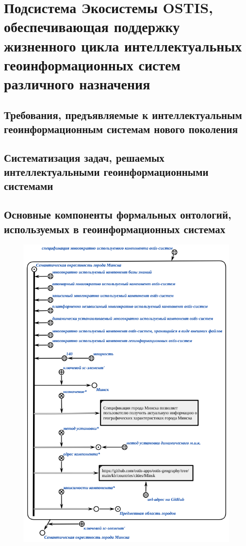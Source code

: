 \chapter{Подсистема Экосистемы OSTIS, обеспечивающая поддержку жизненного цикла интеллектуальных геоинформационных систем различного назначения}
\label{chapter_gis}


\section{Требования, предъявляемые к интеллектуальным геоинформационным системам нового поколения}
\section{Систематизация задач, решаемых интеллектуальными геоинформационными системами}
\section{Основные компоненты формальных онтологий, используемых в геоинформационных системах}
\label{gis_components}

\begin{figure}[H]
	\includegraphics[scale=0.8]{author/part7/figures/gis_kb_component.png}
	\label{fig:gis_ps_component}
\end{figure}

